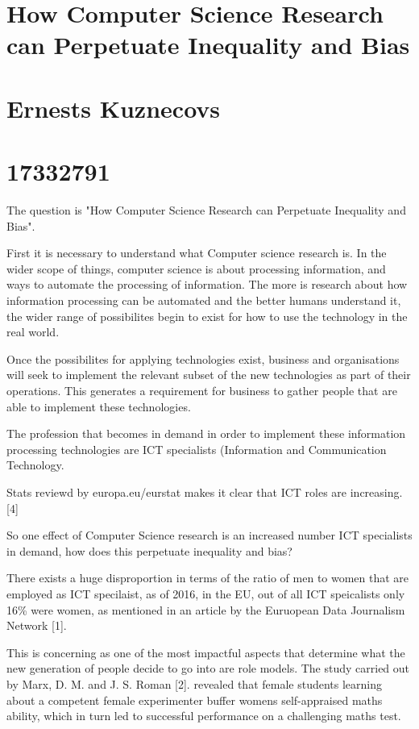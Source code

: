 \documentclass[11pt]{article}
\date{\today}
\title{}
\begin{document}
\section*{How Computer Science Research can Perpetuate Inequality and Bias}
\label{sec:org1f8af06}
\section*{Ernests Kuznecovs}
\label{sec:org5c75b39}
\section*{17332791}
\label{sec:org3d0fab9}
The question is "How Computer Science Research can Perpetuate Inequality and Bias".   

First it is necessary to understand what Computer science research is. In the wider scope of 
things, computer science is about processing information, and ways to automate the processing
of information. The more is research about how information processing can be automated and 
the better humans understand it, the wider range of possibilites begin to exist 
for how to use the technology in the real world.  

Once the possibilites for applying technologies exist, business and organisations will seek
to implement the relevant subset of the new technologies as part of their operations. This 
generates a requirement for business to gather people that are able to implement these technologies.

The profession that becomes in demand in order to implement these information processing technologies
are ICT specialists (Information and Communication Technology.    

Stats reviewd by europa.eu/eurstat makes it clear that ICT roles are increasing. [4]

So one effect of Computer Science research is an increased number ICT 
specialists in demand, how does this perpetuate inequality and bias?   

There exists a huge disproportion in terms of the ratio of men to women that
are employed as ICT specilaist, as of 2016, in the EU, out of all ICT speicalists
only 16\% were women, as mentioned in an article by the Euruopean Data Journalism
Network [1].

This is concerning as one of the most impactful aspects that determine what 
the new generation of people decide to go into are role models. The study carried
out by Marx, D. M. and J. S. Roman [2]. revealed that female students learning
about a competent female experimenter buffer womens self-appraised maths ability, which 
in turn led to successful performance on a challenging maths test.  
\end{document}
